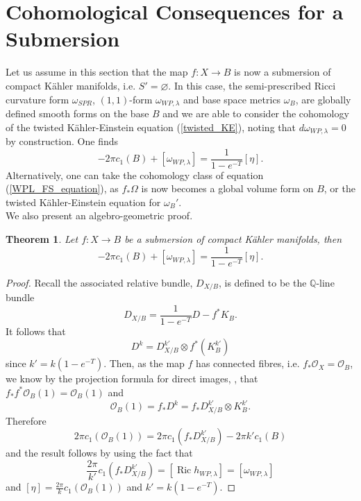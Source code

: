 \documentclass[12pt]{article}
\newtheorem{theorem}{Theorem}[section]
\numberwithin{equation}{section}
\newcommand{\Q}{\mathbb{Q}}
\newcommand{\OO}{\mathcal{O}}
\DeclareMathOperator{\Ric}{Ric}
\begin{document}
\section{Cohomological Consequences for a Submersion}

\noindent Let us assume in this section that the map $f: X \to B$ is now a submersion of compact K\"ahler manifolds, i.e. $S' = \varnothing$. In this case, the semi-prescribed Ricci curvature form $\omega_{SPR}$, $(1,1)$-form $\omega_{WP,\lambda}$ and base space metrics $\omega_B$, are globally defined smooth forms on the base $B$ and we are able to consider the cohomology of the twisted K\"ahler-Einstein equation (\ref{twisted_KE}), noting that $d \omega_{WP,\lambda} = 0$ by construction. One finds
\begin{equation*}
    -2\pi c_1(B) + [\omega_{WP,\lambda}] = \frac{1}{1-e^{-T}}[\eta].
\end{equation*}
Alternatively, one can take the cohomology class of equation (\ref{WPL_FS_equation}), as $f_*\Omega$ is now becomes a global volume form on $B$, or the twisted K\"ahler-Einstein equation for $\omega_B'$.\\ 

\noindent We also present an algebro-geometric proof.

\begin{theorem}\label{base_space_cohomology}
Let $f: X \to B$ be a submersion of compact K\"ahler manifolds, then
\begin{equation*}
    -2\pi c_1(B) + [\omega_{WP,\lambda}] = \frac{1}{1-e^{-T}}[\eta].
\end{equation*}
\end{theorem}

\begin{proof}
Recall the associated relative bundle, $D_{X/B}$, is defined to be the $\Q$-line bundle
\begin{equation*}
    D_{X/B} = \frac{1}{1-e^{-T}} D - f^* K_B.
\end{equation*}
It follows that
\begin{equation*}
    D^k = D_{X/B}^{k'} \otimes f^*( K_B^{k'})
\end{equation*}
since $k' = k(1-e^{-T})$. Then, as the map $f$ has connected fibres, i.e. $f_* \OO_X = \OO_B$, we know by the projection formula for direct images, \cite[Ex. 5.1]{H77}, that $f_* f^* \OO_B(1) = \OO_B(1)$ and
\begin{equation*}
    \OO_B(1) = f_* D^k = f_* D_{X/B}^{k'} \otimes K_B^{k'}.
\end{equation*}
Therefore
\begin{equation*}
    2\pi c_1(\OO_B(1)) = 2\pi c_1(f_* D_{X/B}^{k'}) - 2\pi k' c_1(B)
\end{equation*}
and the result follows by using the fact that
\begin{equation*}
    \frac{2\pi}{k'} c_1(f_* D_{X/B}^{k'}) = [\Ric h_{WP,\lambda}] = [\omega_{WP,\lambda}]
\end{equation*}
and $[\eta] = \frac{2\pi}{k} c_1(\OO_B(1))$ and $k' = k(1-e^{-T})$.
\end{proof}
\end{document}
